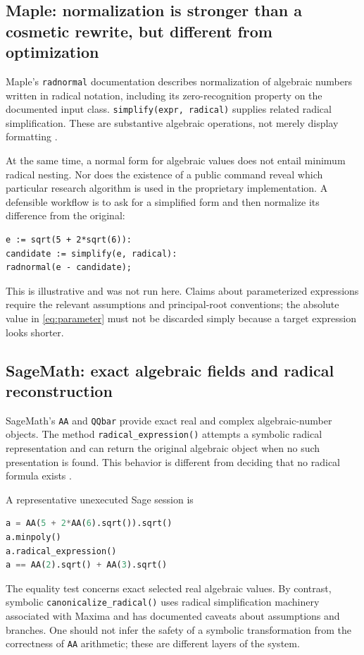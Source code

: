 \documentclass[11pt,letterpaper]{article}
\numberwithin{equation}{section}
\theoremstyle{definition}
\theoremstyle{remark}
\begin{document}
\subsection{Maple: normalization is stronger than a cosmetic rewrite, but different from optimization}
Maple's \texttt{radnormal} documentation describes normalization of algebraic numbers written in radical notation, including its zero-recognition property on the documented input class. \texttt{simplify(expr, radical)} supplies related radical simplification. These are substantive algebraic operations, not merely display formatting \cite{maple}.

At the same time, a normal form for algebraic values does not entail minimum radical nesting. Nor does the existence of a public command reveal which particular research algorithm is used in the proprietary implementation. A defensible workflow is to ask for a simplified form and then normalize its difference from the original:
\begin{lstlisting}
e := sqrt(5 + 2*sqrt(6)):
candidate := simplify(e, radical):
radnormal(e - candidate);
\end{lstlisting}
This is illustrative and was not run here. Claims about parameterized expressions require the relevant assumptions and principal-root conventions; the absolute value in \eqref{eq:parameter} must not be discarded simply because a target expression looks shorter.

\subsection{SageMath: exact algebraic fields and radical reconstruction}
SageMath's \texttt{AA} and \texttt{QQbar} provide exact real and complex algebraic-number objects. The method \texttt{radical\_expression()} attempts a symbolic radical representation and can return the original algebraic object when no such presentation is found. This behavior is different from deciding that no radical formula exists \cite{sage}.

A representative unexecuted Sage session is
\begin{lstlisting}[language=Python]
a = AA(5 + 2*AA(6).sqrt()).sqrt()
a.minpoly()
a.radical_expression()
a == AA(2).sqrt() + AA(3).sqrt()
\end{lstlisting}
The equality test concerns exact selected real algebraic values. By contrast, symbolic \texttt{canonicalize\_radical()} uses radical simplification machinery associated with Maxima and has documented caveats about assumptions and branches. One should not infer the safety of a symbolic transformation from the correctness of \texttt{AA} arithmetic; these are different layers of the system.
\end{document}
